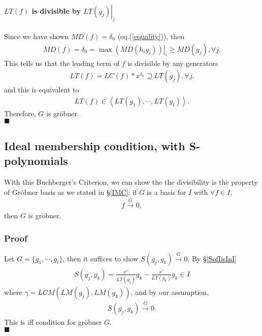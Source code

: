 \documentclass[11pt]{book}
\begin{document}
\paragraph{$LT(f)$ is divisible by $\left.LT(g_j)\right|_j$}
Since we have shown $MD(f) = \delta_0$ (eq.(\ref{equality})), then
\begin{eqnarray}
MD(f) = \delta_0 = \left. \max\left(MD(h_i g_i) \right) \right|_i \geq MD(g_j), \forall j.
\end{eqnarray}
This tells us that the leading term of $f$ is divisible by any generators
\begin{eqnarray}
LT(f) = LC(f) * x^{\delta_0} \sqsupseteq LT(g_j), \forall j.
\end{eqnarray}
and this is equivalent to
\begin{eqnarray}
LT(f) \in \left< LT(g_1), \cdots, LT(g_t) \right>.
\end{eqnarray}
Therefore, $G$ is gr\"obner.\\
$\blacksquare$

\subsection{Ideal membership condition, with S-polynomials}
\label{isGroebner2}
With this Buchberger's Criterion, we can show the the divisibility is the property of Gr\"obner basis as we stated in \S\ref{IMC}; if $G$ is a basis for $I$ with $\forall f \in I$,
\begin{eqnarray}
f \stackrel{G}{\to} 0,
\end{eqnarray}
then $G$ is gr\"obner.

\subsubsection{Proof}
Let $G = \{g_1, \cdots, g_t\}$, then it suffices to show $S(g_j, g_k) \stackrel{G}{\to} 0$.
By \S\ref{SofIisInI}
\begin{eqnarray}
S(g_j, g_k) = \frac{x^\gamma}{LT(g_j)}g_k - \frac{x^\gamma}{LT(g_k)}g_k \in I
\end{eqnarray}
where $\gamma = LCM \left( LM(g_j), LM(g_k)\right)$, and by our assumption,
\begin{eqnarray}
S(g_j, g_k) \stackrel{G}{\to} 0.
\end{eqnarray}
This is iff condition for gr\"obner $G$.\\
$\blacksquare$
\end{document}
